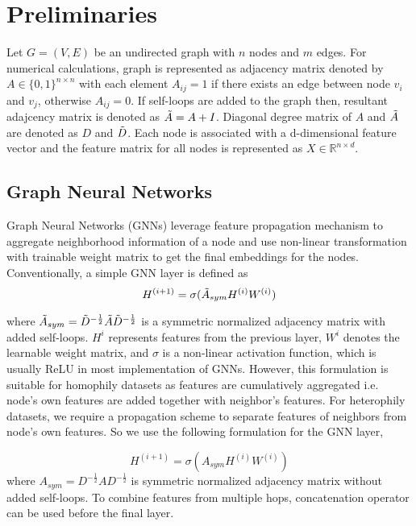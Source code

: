 \documentclass[sigconf,natbib=false]{acmart}
\begin{document}
\section{Preliminaries}
\label{preliminaries}

Let $G = (V,E)$ be an undirected graph with $n$ nodes and $m$ edges. For numerical calculations, graph is represented as adjacency matrix denoted by $A\in \{0,1\}^{n\times n}$ with each element $A_{ij}=1$ if there exists an edge between node $v_i$ and $v_j$, otherwise $A_{ij}=0$. If self-loops are added to the graph then, resultant adajcency matrix is denoted as $\Tilde{A} = A+I$. Diagonal degree matrix of $A$ and $\Tilde{A}$ are denoted as $D$ and $\Tilde{D}$. Each node is associated with a d-dimensional feature vector and the feature matrix for all nodes is represented as $X \in \mathbb{R} ^{n \times d}$.

\subsection{Graph Neural Networks}

Graph Neural Networks (GNNs) leverage feature propagation mechanism \cite{gilmer_neural_2017} to aggregate neighborhood information of a node and use non-linear transformation with trainable weight matrix to get the final embeddings for the nodes. Conventionally, a simple GNN layer is defined as 
\begin{equation}
  \label{eq:homophily_gnn}
  H^{(i+1)} = \sigma (\Tilde{A}_{sym}H^{(i)}W^{(i)})
\end{equation}

where $\Tilde{A}_{sym} = \Tilde{D}^{-\frac{1}{2}} \Tilde{A}\Tilde{D}^{-\frac{1}{2}}$ is a symmetric normalized adjacency matrix with added self-loops. $H^i$ represents features from the previous layer, $W^i$ denotes the learnable weight matrix, and $\sigma$ is a non-linear activation function, which is usually ReLU in most implementation of GNNs. However, this formulation is suitable for homophily datasets as features are cumulatively aggregated i.e. node's own features are added together with neighbor's features. For heterophily datasets, we require a propagation scheme to separate features of neighbors from node's own features. So we use the following formulation for the GNN layer,

\begin{equation}
      \label{eq:heterophily_gnn}
      H^{(i+1)} = \sigma (A_{sym}H^{(i)}W^{(i)})
\end{equation}
where $A_{sym} = D^{-\frac{1}{2}} AD^{-\frac{1}{2}}$ is symmetric normalized adjacency matrix without added self-loops. To combine features from multiple hops, concatenation operator can be used before the final layer.
\end{document}
